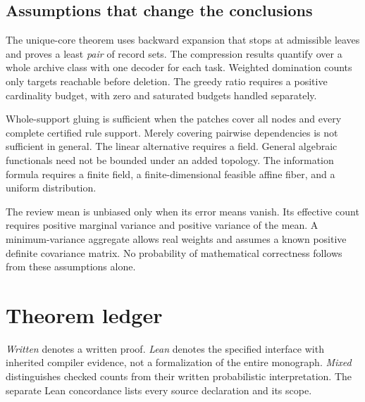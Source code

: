 \documentclass[11pt,oneside]{article}
\theoremstyle{komorebiplain}
\theoremstyle{komorebidefinition}
\theoremstyle{komorebiremark}
\begin{document}
\subsection*{Assumptions that change the conclusions}
The unique-core theorem uses backward expansion that stops at admissible leaves and proves a least \emph{pair} of record sets. The compression results quantify over a whole archive class with one decoder for each task. Weighted domination counts only targets reachable before deletion. The greedy ratio requires a positive cardinality budget, with zero and saturated budgets handled separately.

Whole-support gluing is sufficient when the patches cover all nodes and every complete certified rule support. Merely covering pairwise dependencies is not sufficient in general. The linear alternative requires a field. General algebraic functionals need not be bounded under an added topology. The information formula requires a finite field, a finite-dimensional feasible affine fiber, and a uniform distribution.

The review mean is unbiased only when its error means vanish. Its effective count requires positive marginal variance and positive variance of the mean. A minimum-variance aggregate allows real weights and assumes a known positive definite covariance matrix. No probability of mathematical correctness follows from these assumptions alone.



\clearpage
\section{Theorem ledger}
\label{app:ledger}

\emph{Written} denotes a written proof. \emph{Lean} denotes the specified interface with inherited compiler evidence, not a formalization of the entire monograph. \emph{Mixed} distinguishes checked counts from their written probabilistic interpretation. The separate Lean concordance lists every source declaration and its scope.
\end{document}
